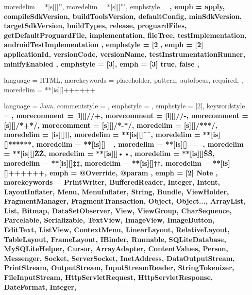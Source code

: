  {
	moredelim = *[s][\color{gray}]{'}{'},
	moredelim = *[s][\color{ForestGreen}]{"}{"},
	emphstyle = \bfseries,
	emph = {
		apply,
		compileSdkVersion,
		buildToolsVersion,
		defaultConfig,
		minSdkVersion,
		targetSdkVersion,
		buildTypes,
		release,
		proguardFiles,
		getDefaultProguardFile,
		implementation,
		fileTree, testImplementation,
		androidTestImplementation
	},
	emphstyle = {[2]\bfseries\color{violet}},
	emph = {[2]
		applicationId,
		versionCode,
		versionName,
		testInstrumentationRunner,
		minifyEnabled
	},
	emphstyle = {[3]\bfseries\color{orange}},
	emph = {[3]
		true,
		false
	},
}

 {
	language = HTML,
	morekeywords = {
		placeholder,
		pattern,
		autofocus,
		required,
	},
	moredelim = **[is][{\btHL[fill=green!30]}]{+++}{+++}
}

 {
	language = Java,
	commentstyle = \color{ashgrey},
	emphstyle = {\color{darkgray}},
	emphstyle = {[2]\bfseries},
	keywordstyle = \color{black}\bfseries,
	morecomment = [l][\color{blue}]{//+},		%
	morecomment = [l][\color{red}]{//-},		%
	morecomment = [s][\color{blue}]{/*+}{*/},	%
	morecomment = [s][\color{red}]{/*-}{*/},	%
	moredelim = [s][\color{ashgrey}]{/**}{*/},		%
	moredelim = [is][\soutthick]{|}{|},						%
	moredelim = **[is][\color{blue}]{^}{^},					%
	moredelim = **[is][\color{ForestGreen}]{***}{***},		%
	moredelim = **[is][\color{red}]{~}{~},					%
	moredelim = **[is][\btHL]{---}{---},					%
	moredelim = **[is][{\btHL[fill=blue!60]}]{Ž}{Ž},		%
	moredelim = **[is][{\btHL[fill=SkyBlue]}]{•}{•},		%
	moredelim = **[is][{\btHL[fill=orange!60]}]{Š}{Š},		%
	moredelim = **[is][{\btHL[fill=yellow!60]}]{‡}{‡},		%
	moredelim = **[is][{\btHL[fill=ForestGreen]}]{†}{†},	%
	moredelim = **[is][{\btHL[fill=green!30]}]{+++}{+++},	%
	emph = {
		@Override,
		@param
	},
	emph = {[2]
		Note
	},
	morekeywords = {
		PrintWriter, BufferedReader, Integer,
		Intent, LayoutInflater, Menu, MenuInflater, String, Bundle, ViewHolder,
		FragmentManager, FragmentTransaction,
		Object, Object...,
		ArrayList, List, Bitmap, DataSetObserver,
		View, ViewGroup,
		CharSequence, Parcelable, Serializable,
		TextView, ImageView,
		ImageButton, EditText, ListView, ContextMenu,
		LinearLayout, RelativeLayout, TableLayout, FrameLayout,
		IBinder, Runnable,
		SQLiteDatabase, MySQLiteHelper, Cursor, ArrayAdapter, ContentValues,
		Person, Messenger,
		Socket, ServerSocket,
		InetAddress, DataOutputStream, PrintStream, OutputStream, InputStreamReader, StringTokenizer, FileInputStream,
		HttpServletRequest, HttpServletResponse,
		DateFormat, Integer,
	}
}

